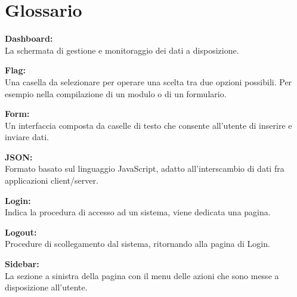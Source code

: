 \section{Glossario}
\textbf{Dashboard:}\\La schermata di gestione e monitoraggio dei dati a disposizione.

\textbf{Flag:}\\Una casella da selezionare per operare una scelta tra due opzioni possibili. Per esempio nella compilazione di un modulo o di un formulario.

\textbf{Form:}\\Un interfaccia composta da caselle di testo che consente all'utente di inserire e inviare dati.

\textbf{JSON:}\\Formato basato sul linguaggio JavaScript, adatto all'interscambio di dati fra applicazioni client/server.

\textbf{Login:}\\Indica la procedura di accesso ad un sistema, viene dedicata una pagina.

\textbf{Logout:}\\Procedure di scollegamento dal sistema, ritornando alla pagina di Login. 

\textbf{Sidebar:}\\ La sezione a sinistra della pagina con il menu delle azioni che sono messe a disposizione all'utente.